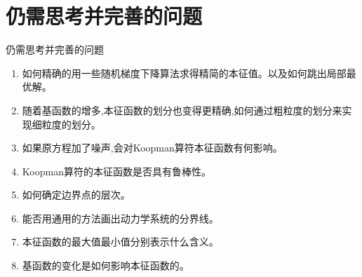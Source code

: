 \documentclass{beamer}
\begin{document}
\section{仍需思考并完善的问题}
\begin{frame}{仍需思考并完善的问题}
\begin{enumerate}
\item 如何精确的用一些随机梯度下降算法求得精简的本征值。以及如何跳出局部最优解。
\item 随着基函数的增多,本征函数的划分也变得更精确,如何通过粗粒度的划分来实现细粒度的划分。
\item 如果原方程加了噪声,会对Koopman算符本征函数有何影响。
\item Koopman算符的本征函数是否具有鲁棒性。
\item 如何确定边界点的层次。
\item 能否用通用的方法画出动力学系统的分界线。
\item 本征函数的最大值最小值分别表示什么含义。
\item 基函数的变化是如何影响本征函数的。
\end{enumerate}
\end{frame}
\end{document}
